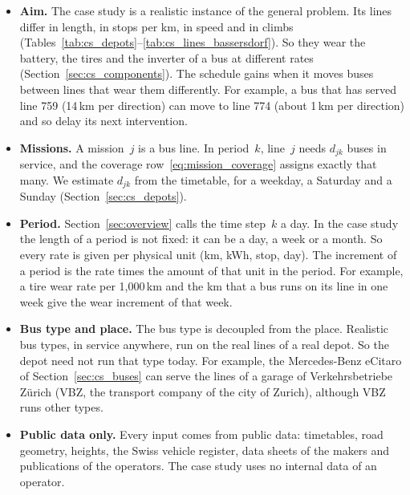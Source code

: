 \documentclass[11pt,a4paper]{article}
\theoremstyle{plain}
\theoremstyle{definition}
\theoremstyle{remark}
\begin{document}
\begin{itemize}
  \item \textbf{Aim.} The case study is a realistic instance of the general problem.
    Its lines differ in length, in stops per km, in speed and in climbs (Tables~\ref{tab:cs_depots}--\ref{tab:cs_lines_bassersdorf}).
    So they wear the battery, the tires and the inverter of a bus at different rates (Section~\ref{sec:cs_components}).
    The schedule gains when it moves buses between lines that wear them differently.
    For example, a bus that has served line 759 (14\,km per direction) can move to line 774 (about 1\,km per direction) and so delay its next intervention.
  \item \textbf{Missions.} A mission~$j$ is a bus line.
    In period~$k$, line~$j$ needs $d_{jk}$ buses in service, and the coverage row~\eqref{eq:mission_coverage} assigns exactly that many.
    We estimate $d_{jk}$ from the timetable, for a weekday, a Saturday and a Sunday (Section~\ref{sec:cs_depots}).
  \item \textbf{Period.} Section~\ref{sec:overview} calls the time step~$k$ a day.
    In the case study the length of a period is not fixed: it can be a day, a week or a month.
    So every rate is given per physical unit (km, kWh, stop, day).
    The increment of a period is the rate times the amount of that unit in the period.
    For example, a tire wear rate per 1,000\,km and the km that a bus runs on its line in one week give the wear increment of that week.
  \item \textbf{Bus type and place.} The bus type is decoupled from the place.
    Realistic bus types, in service anywhere, run on the real lines of a real depot.
    So the depot need not run that type today.
    For example, the Mercedes-Benz eCitaro of Section~\ref{sec:cs_buses} can serve the lines of a garage of Verkehrsbetriebe Z\"urich (VBZ, the transport company of the city of Zurich), although VBZ runs other types.
  \item \textbf{Public data only.} Every input comes from public data: timetables, road geometry, heights, the Swiss vehicle register, data sheets of the makers and publications of the operators.
    The case study uses no internal data of an operator.
\end{itemize}
\end{document}
